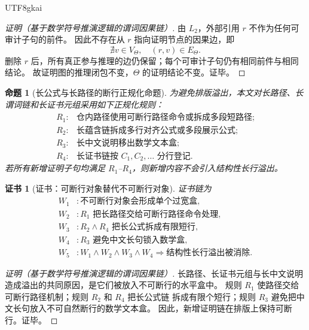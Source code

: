 \documentclass[12pt]{article}
\newtheorem{proposition}{命题}[section]
\newtheorem{Certificate}{证书}[section]
\begin{document}
\begin{CJK*}{UTF8}{gkai}
\begin{proof}[证明（基于数学符号推演逻辑的谓词因果链）]
由 \(L_2\)，外部引用 \(r\) 不作为任何可审计子句的前件。
因此不存在从 \(r\) 指向证明节点的因果边，即
\[
  \nexists v\in V_\Theta,\quad (r,v)\in E_\Theta.
\]
删除 \(r\) 后，所有真正参与推理的边仍保留；每个可审计子句仍有相同前件与相同结论。
故证明图的推理闭包不变，\(\Theta\) 的证明结论不变。证毕。
\end{proof}

\begin{proposition}[长公式与长路径的断行正规化命题]
\label{prop:tex59-linebreak-normalization}
为避免排版溢出，本文对长路径、长谓词链和长证书元组采用如下正规化规则：
\[
\begin{array}{ll}
  R_1: & \text{仓内路径使用可断行路径命令或拆成多段短路径};\\
  R_2: & \text{长蕴含链拆成多行对齐公式或多段展示公式};\\
  R_3: & \text{长中文说明移出数学文本盒};\\
  R_4: & \text{长证书链按 }C_1,C_2,\ldots\text{ 分行登记}.
\end{array}
\]
若所有新增证明子句均满足 \(R_1\)--\(R_4\)，则新增内容不会引入结构性长行溢出。
\end{proposition}

\begin{Certificate}[证书：可断行对象替代不可断行对象]
\label{cert:tex59-linebreak-normalization}
证书链为
\[
\begin{aligned}
  W_1 &: \text{不可断行对象会形成单个过宽盒},\\
  W_2 &: R_1\text{ 把长路径交给可断行路径命令处理},\\
  W_3 &: R_2\wedge R_4\text{ 把长公式拆成有限短行},\\
  W_4 &: R_3\text{ 避免中文长句锁入数学盒},\\
  W_5 &: W_1\wedge W_2\wedge W_3\wedge W_4
  \Rightarrow
  \text{结构性长行溢出被消除}.
\end{aligned}
\]
\end{Certificate}

\begin{proof}[证明（基于数学符号推演逻辑的谓词因果链）]
长路径、长证书元组与长中文说明造成溢出的共同原因，是它们被放入不可断行的水平盒中。
规则 \(R_1\) 使路径交给可断行路径机制；规则 \(R_2\) 和 \(R_4\) 把长公式链
拆成有限个短行；规则 \(R_3\) 避免把中文长句放入不可自然断行的数学文本盒。
因此，新增证明链在排版上保持可断行。证毕。
\end{proof}


\end{CJK*}
\end{document}
